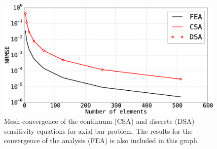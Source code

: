 \begin{figure}[h]
    \centering
    \includegraphics[width=14.00cm]{Chapter_2/figure/axial_bar_continuum_sensitivity_analysis.eps}
    \caption{Mesh convergence of the continuum (CSA) and discrete (DSA) sensitivity equations for axial bar problem. The results for the convergence of the analysis (FEA) is also included in this graph.}
    \label{fig:C2_continuumSensitivityResults}
\end{figure}